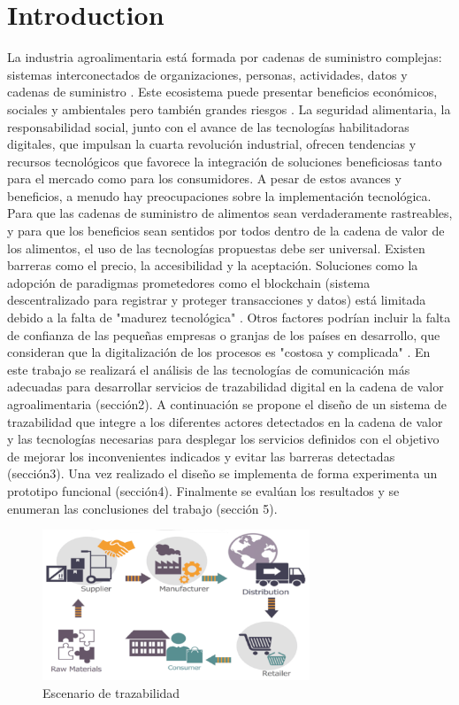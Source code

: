 \section{Introduction}
La industria agroalimentaria está formada por cadenas de suministro complejas: sistemas interconectados de organizaciones, personas, actividades, datos y cadenas de suministro \cite{traza1}.
Este ecosistema puede presentar beneficios económicos, sociales y ambientales pero también grandes riesgos \cite{traza2}.
La seguridad alimentaria, la responsabilidad social,
junto con el avance de las tecnologías habilitadoras digitales, que impulsan la cuarta revolución industrial, ofrecen tendencias y recursos tecnológicos que favorece la integración de soluciones beneficiosas tanto para el mercado como para los consumidores. A pesar de estos avances y beneficios, a menudo hay preocupaciones sobre la implementación tecnológica. Para que las cadenas de suministro de alimentos sean verdaderamente rastreables, y para que los beneficios sean sentidos por todos dentro de la cadena de valor de los alimentos, el uso de las tecnologías propuestas debe ser universal. Existen barreras como el precio, la accesibilidad y la aceptación. Soluciones como la adopción de paradigmas prometedores como el blockchain (sistema descentralizado para registrar y proteger transacciones y datos) está limitada debido a la falta de "madurez tecnológica" \cite{blockchain1}. Otros factores podrían incluir la falta de confianza de las pequeñas empresas o granjas de los países en desarrollo, que consideran que la digitalización de los procesos es "costosa y complicada" \cite{agro1}.
En este trabajo se realizará el análisis de las tecnologías de comunicación más adecuadas para desarrollar servicios de trazabilidad digital en la cadena de valor agroalimentaria (sección2). A continuación se propone el diseño de un sistema de trazabilidad que integre a los diferentes actores detectados en la cadena de valor y las tecnologías necesarias para desplegar los servicios definidos con el objetivo de mejorar los inconvenientes indicados y evitar las barreras detectadas (sección3). Una vez realizado el diseño se implementa de forma experimenta un prototipo funcional (sección4). Finalmente se evalúan los resultados y se enumeran las conclusiones del trabajo (sección 5).

\begin{figure}[tp]
\centering
\includegraphics[width=8cm]{figures/Traza1.png}

\caption{Escenario de trazabilidad}
\label{escenario}
\end{figure}


